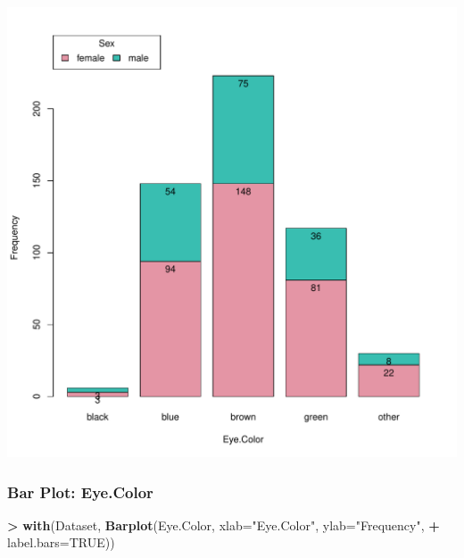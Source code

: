 \documentclass[
]{article}
\newenvironment{Shaded}{\begin{snugshade}}{\end{snugshade}}
\newcommand{\AttributeTok}[1]{\textcolor[rgb]{0.13,0.29,0.53}{#1}}
\newcommand{\ConstantTok}[1]{\textcolor[rgb]{0.56,0.35,0.01}{#1}}
\newcommand{\FunctionTok}[1]{\textcolor[rgb]{0.13,0.29,0.53}{\textbf{#1}}}
\newcommand{\NormalTok}[1]{#1}
\newcommand{\SpecialCharTok}[1]{\textcolor[rgb]{0.81,0.36,0.00}{\textbf{#1}}}
\newcommand{\StringTok}[1]{\textcolor[rgb]{0.31,0.60,0.02}{#1}}
\begin{document}
\includegraphics[width=750px]{RcmdrMarkdown_files/figure-latex/unnamed-chunk-17-1}

\subsubsection{Bar Plot: Eye.Color}\label{bar-plot-eye.color-1}

\begin{Shaded}
\begin{Highlighting}[]
\SpecialCharTok{\textgreater{}} \FunctionTok{with}\NormalTok{(Dataset, }\FunctionTok{Barplot}\NormalTok{(Eye.Color, }\AttributeTok{xlab=}\StringTok{"Eye.Color"}\NormalTok{, }\AttributeTok{ylab=}\StringTok{"Frequency"}\NormalTok{, }
\SpecialCharTok{+}   \AttributeTok{label.bars=}\ConstantTok{TRUE}\NormalTok{))}
\end{Highlighting}
\end{Shaded}
\end{document}
